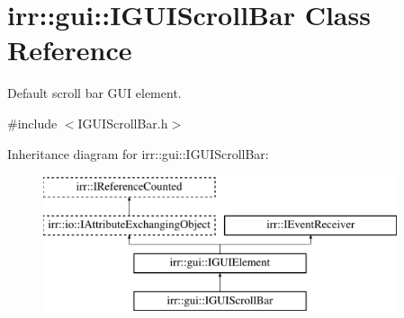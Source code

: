 \hypertarget{classirr_1_1gui_1_1IGUIScrollBar}{}\section{irr\+:\+:gui\+:\+:I\+G\+U\+I\+Scroll\+Bar Class Reference}
\label{classirr_1_1gui_1_1IGUIScrollBar}


Default scroll bar G\+UI element.  




{\ttfamily \#include $<$I\+G\+U\+I\+Scroll\+Bar.\+h$>$}

Inheritance diagram for irr\+:\+:gui\+:\+:I\+G\+U\+I\+Scroll\+Bar\+:\begin{figure}[H]
\begin{center}
\leavevmode
\includegraphics[height=4.000000cm]{classirr_1_1gui_1_1IGUIScrollBar}
\end{center}
\end{figure}
